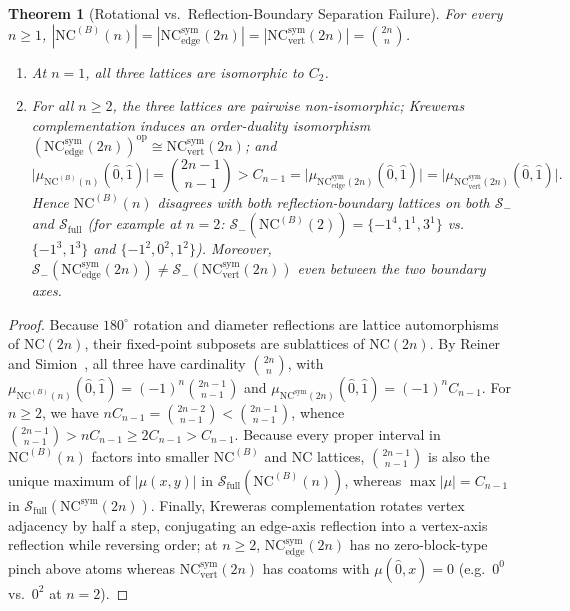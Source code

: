 \documentclass[11pt]{article}
\newtheorem{theorem}{Theorem}[section]
\theoremstyle{definition}
\newcommand{\NC}{\mathrm{NC}}
\newcommand{\NCB}{\mathrm{NC}^{(B)}}
\newcommand{\NCsym}{\mathrm{NC}^{\mathrm{sym}}}
\begin{document}
\begin{theorem}[Rotational vs.\ Reflection-Boundary Separation Failure]\label{thm:equinumerous}
For every $n \ge 1$, $|\NCB(n)| = |\NCsym_{\mathrm{edge}}(2n)| = |\NCsym_{\mathrm{vert}}(2n)| = \binom{2n}{n}$.
\begin{enumerate}
  \item At $n = 1$, all three lattices are isomorphic to $C_2$.
  \item For all $n \ge 2$, the three lattices are pairwise non-isomorphic; Kreweras complementation induces an order-duality isomorphism $(\NCsym_{\mathrm{edge}}(2n))^{\mathrm{op}} \cong \NCsym_{\mathrm{vert}}(2n)$; and
  \[
    \bigl|\mu_{\NCB(n)}(\hat{0},\hat{1})\bigr| = \binom{2n-1}{n-1} > C_{n-1} = \bigl|\mu_{\NCsym_{\mathrm{edge}}(2n)}(\hat{0},\hat{1})\bigr| = \bigl|\mu_{\NCsym_{\mathrm{vert}}(2n)}(\hat{0},\hat{1})\bigr|.
  \]
  Hence $\NCB(n)$ disagrees with both reflection-boundary lattices on both $\mathcal{S}_-$ and $\mathcal{S}_{\mathrm{full}}$ (for example at $n = 2$: $\mathcal{S}_-(\NCB(2)) = \{-1^4, 1^1, 3^1\}$ vs.\ $\{-1^3, 1^3\}$ and $\{-1^2, 0^2, 1^2\}$). Moreover, $\mathcal{S}_-(\NCsym_{\mathrm{edge}}(2n)) \ne \mathcal{S}_-(\NCsym_{\mathrm{vert}}(2n))$ even between the two boundary axes.
\end{enumerate}
\end{theorem}
\begin{proof}
Because $180^\circ$ rotation and diameter reflections are lattice automorphisms of $\NC(2n)$, their fixed-point subposets are sublattices of $\NC(2n)$. By Reiner~\cite{Rei97} and Simion~\cite{Sim00}, all three have cardinality $\binom{2n}{n}$, with $\mu_{\NCB(n)}(\hat{0},\hat{1}) = (-1)^n\binom{2n-1}{n-1}$ and $\mu_{\NCsym(2n)}(\hat{0},\hat{1}) = (-1)^n C_{n-1}$. For $n \ge 2$, we have $n C_{n-1} = \binom{2n-2}{n-1} < \binom{2n-1}{n-1}$, whence $\binom{2n-1}{n-1} > n C_{n-1} \ge 2 C_{n-1} > C_{n-1}$. Because every proper interval in $\NCB(n)$ factors into smaller $\NCB$ and $\NC$ lattices, $\binom{2n-1}{n-1}$ is also the unique maximum of $|\mu(x,y)|$ in $\mathcal{S}_{\mathrm{full}}(\NCB(n))$, whereas $\max|\mu| = C_{n-1}$ in $\mathcal{S}_{\mathrm{full}}(\NCsym(2n))$. Finally, Kreweras complementation rotates vertex adjacency by half a step, conjugating an edge-axis reflection into a vertex-axis reflection while reversing order; at $n \ge 2$, $\NCsym_{\mathrm{edge}}(2n)$ has no zero-block-type pinch above atoms whereas $\NCsym_{\mathrm{vert}}(2n)$ has coatoms with $\mu(\hat{0}, x) = 0$ (e.g.\ $0^0$ vs.\ $0^2$ at $n=2$).
\end{proof}
\end{document}
